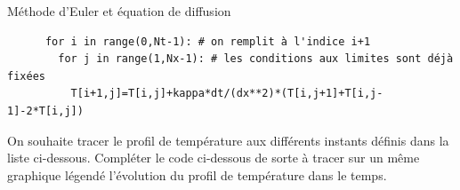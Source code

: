 \begin{exo}[PC][1][devoir]{Méthode d'Euler et équation de diffusion}
\begin{quest}
\begin{verbatim}
      for i in range(0,Nt-1): # on remplit à l'indice i+1
        for j in range(1,Nx-1): # les conditions aux limites sont déjà fixées
          T[i+1,j]=T[i,j]+kappa*dt/(dx**2)*(T[i,j+1]+T[i,j-1]-2*T[i,j])
    \end{verbatim}
    \item On souhaite tracer le profil de température aux différents instants définis dans la liste ci-dessous. Compléter le code ci-dessous de sorte à tracer sur un même graphique légendé l'évolution du profil de température dans le temps.

    
  \end{quest}
\end{exo}

